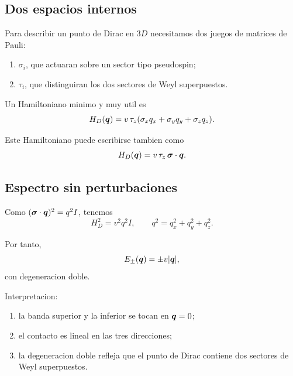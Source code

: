\subsection{Dos espacios internos}

Para describir un punto de Dirac en \(3D\) necesitamos dos juegos de matrices de Pauli:

\begin{enumerate}[leftmargin=*]
  \item \(\sigma_i\), que actuaran sobre un sector tipo pseudospin;
  \item \(\tau_i\), que distinguiran los dos sectores de Weyl superpuestos.
\end{enumerate}

Un Hamiltoniano minimo y muy util es
\begin{equation}
H_D(\bm{q})=v\,\tau_z(\sigma_x q_x+\sigma_y q_y+\sigma_z q_z).
\label{c13:eq:HD}
\end{equation}

Este Hamiltoniano puede escribirse tambien como
\begin{equation}
H_D(\bm{q})=v\,\tau_z\, \bm{\sigma}\cdot \bm{q}.
\end{equation}

\subsection{Espectro sin perturbaciones}

Como \((\bm{\sigma}\cdot\bm{q})^2 = q^2 I\), tenemos
\begin{equation}
H_D^2 = v^2 q^2 I,
\qquad
q^2=q_x^2+q_y^2+q_z^2.
\end{equation}

Por tanto,
\begin{equation}
E_\pm(\bm{q})=\pm v|\bm{q}|,
\label{c13:eq:dirac-disp}
\end{equation}
con degeneracion doble.

Interpretacion:

\begin{enumerate}[leftmargin=*]
  \item la banda superior y la inferior se tocan en \(\bm{q}=0\);
  \item el contacto es lineal en las tres direcciones;
  \item la degeneracion doble refleja que el punto de Dirac contiene dos sectores de Weyl superpuestos.
\end{enumerate}

